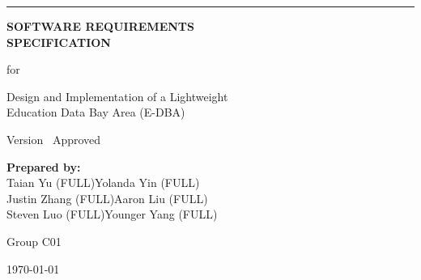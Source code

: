\begin{flushright}
    \vspace*{1.5cm}
    \rule{0.75\textwidth}{5pt}
    
    \vspace{1.2cm}
    \fontsize{24}{28}\selectfont
    \textbf{SOFTWARE REQUIREMENTS \\ SPECIFICATION}
    
    \vspace{1.5cm}
    \fontsize{14}{16}\selectfont
    for
    
    \vspace{1cm}
    \fontsize{18}{22}\selectfont
    Design and Implementation of a Lightweight \\[0.3em]
    Education Data Bay Area (E-DBA)
    
    \vspace{1.5cm}
    \fontsize{13}{15}\selectfont
    Version \myversion\ Approved
    
    \vspace{1.8cm}
    \begin{minipage}{0.7\textwidth}
    \flushright
    \fontsize{12}{14}\selectfont
    \textbf{Prepared by:} \\
    Taian Yu (FULL)\quad Yolanda Yin (FULL) \\
    Justin Zhang (FULL)\quad Aaron Liu (FULL) \\
    Steven Luo (FULL)\quad Younger Yang (FULL)
    \end{minipage}
    
    \vspace{1.2cm}
    \fontsize{14}{16}\selectfont
    Group C01
    
    \vspace{2cm}
    \today
\end{flushright}